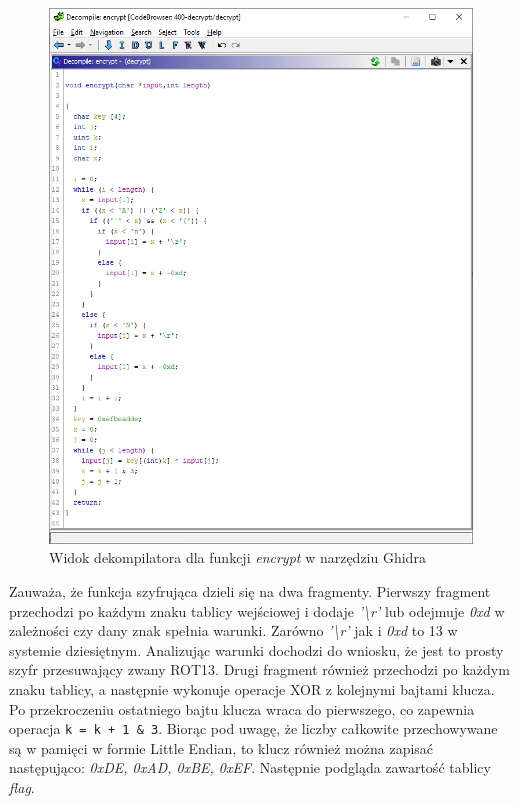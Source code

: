 \documentclass[language=polish,type=eng]{aghmodern}
\begin{document}
\begin{figure}[H]
\centering
\includegraphics[width=\textwidth]{400_encrypt}
\caption{Widok dekompilatora dla funkcji \emph{encrypt} w narzędziu Ghidra}
\end{figure}

Zauważa, że funkcja szyfrująca dzieli się na dwa fragmenty.
Pierwszy fragment przechodzi po każdym znaku tablicy wejściowej i dodaje
\emph{'\textbackslash r'} lub
odejmuje \emph{0xd} w zależności czy dany znak spełnia warunki.
Zarówno \emph{'\textbackslash r'} jak i \emph{0xd} to 13 w systemie dziesiętnym.
Analizując warunki dochodzi do wniosku, że jest to prosty szyfr przesuwający zwany ROT13.
Drugi fragment również przechodzi po każdym znaku tablicy, a następnie wykonuje
operacje XOR z kolejnymi bajtami klucza. Po przekroczeniu ostatniego bajtu klucza
wraca do pierwszego, co zapewnia operacja \texttt{k = k + 1 & 3}.
Biorąc pod uwagę, że liczby całkowite przechowywane
są w pamięci w formie Little Endian, to klucz również można zapisać następująco:
\emph{0xDE, 0xAD, 0xBE, 0xEF}. Następnie podgląda zawartość tablicy \emph{flag}.
\end{document}
